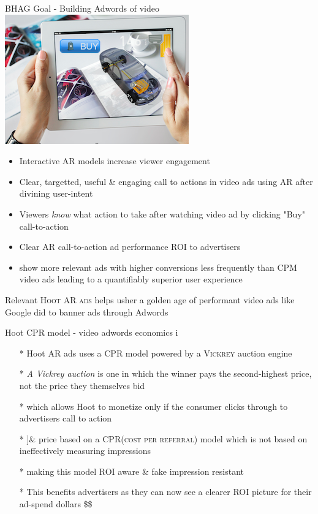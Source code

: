 \documentclass[11pt]{beamer}
\begin{document}
\begin{frame}[fragile]{ BHAG Goal - Building Adwords of video \includegraphics[scale=.1]{static/arad/arad5} }
\begin{itemize}[<+-| alert@+>]
\item Interactive AR models increase viewer engagement
\item Clear, targetted, useful \& engaging call to actions in video ads using AR after divining user-intent
\item Viewers \emph{know} what action to take after watching video ad by clicking "Buy" call-to-action
\item Clear AR call-to-action ad performance \textsc{ROI} to advertisers 
\item show more relevant ads with higher conversions less frequently than CPM video ads leading to a quantifiably superior user experience 
\end{itemize}
\pause

\Large{
Relevant \textsc{Hoot AR ads} helps usher a golden age of performant video ads like Google did to banner ads through Adwords
}



\end{frame}

\begin{frame}[t]{Hoot CPR model - video adwords economics i}
\begin{itemize}[<+-| alert@+>]
\item[*] Hoot AR ads uses a CPR model powered by a \textsc{Vickrey} auction engine
\item[*]\emph{A Vickrey auction} is one in which the winner pays the second-highest price, not the price they themselves bid
\item[*]which allows Hoot to monetize only if the consumer clicks through to advertisers call to action
\item[*]]\& price based on a \textsc{CPR(cost per referral)} model which is not based on ineffectively measuring impressions
\item[*]making this model ROI aware \& fake impression resistant
\item[*]This benefits advertisers as they can now see a clearer ROI picture for their ad-spend dollars \$\$ 
\end{itemize}
\end{frame}
\end{document}
